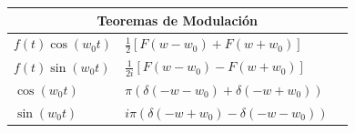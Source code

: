 \documentclass[12pt, fleqn]{report}                             %
\newcommand{\Wrap}[1]{\left( #1 \right)}                        %
\newcommand{\Cos}[1]{\cos\Wrap{#1}}                             %
\newcommand{\Sin}[1]{\sin\Wrap{#1}}                             %
\begin{document}
\begin{table}[ht]
\begin{tabular}{|m{16em}|m{16em}|@{}m{0pt}@{}}
                    \multicolumn{3}{|c|}{Teoremas de Modulación}                        \\            \hline
                    $f(t) \Cos{w_0t}  $     & $\frac{1}{2}[F(w-w_0)+F(w+w_0)]           $ &\\[1em]    \hline
                    $f(t) \Sin{w_0t}  $     & $\frac{1}{2i}[F(w-w_0)-F(w+w_0)]          $ &\\[1em]    \hline
                    $\Cos{w_0t}       $     & $\pi(\delta(-w-w_0)+\delta(-w+w_0))       $ &\\[1em]    \hline
                    $\Sin{w_0t}       $     & $i\pi(\delta(-w+w_0)-\delta(-w-w_0))      $ &\\[1em]    \hline
                    
                
                \end{tabular}
            \end{table}

            \clearpage
\end{document}
